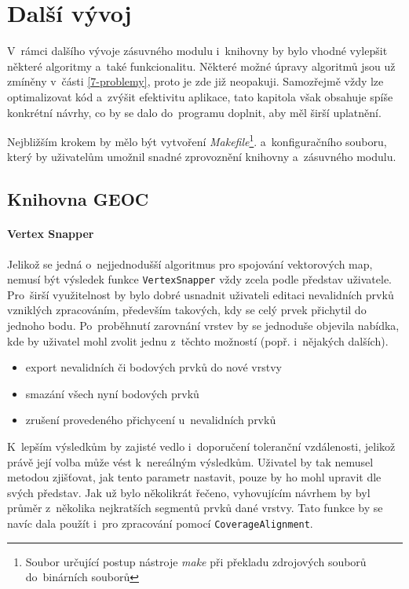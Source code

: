 \chapter{Další vývoj}
\label{8-vyvoj}

V~rámci dalšího vývoje zásuvného modulu i~knihovny 
by bylo vhodné vylepšit některé algoritmy a~také funkcionalitu.
Některé možné úpravy algoritmů jsou už zmíněny v~části 
\ref{7-problemy}, proto je zde již neopakuji. 
Samozřejmě vždy lze optimalizovat kód a~zvýšit efektivitu aplikace,
tato kapitola však obsahuje spíše konkrétní návrhy, co by se dalo 
do~programu doplnit, aby měl širší uplatnění.

Nejbližším krokem by mělo být vytvoření \textit{Makefile}\footnote{
Soubor určující postup nástroje \textit{make} při překladu zdrojových
souborů do~binárních souborů}. a~konfiguračního souboru, který by 
uživatelům umožnil snadné zprovoznění knihovny a~zásuvného modulu.

\section{Knihovna GEOC}
\label{geoc-vyvoj}

\subsubsection{Vertex Snapper}
\label{vs-vyvoj}

Jelikož se jedná o~nejjednodušší algoritmus pro spojování vektorových map,
nemusí být výsledek funkce \texttt{Vertex\-Snapper} vždy zcela podle
představ uživatele. Pro~širší využitelnost by bylo dobré usnadnit
uživateli editaci nevalidních prvků vzniklých zpracováním, především
takových, kdy se celý prvek přichytil do jednoho bodu. Po~proběhnutí
zarovnání vrstev by se jednoduše objevila nabídka, kde by uživatel mohl
zvolit jednu z~těchto možností (popř. i~nějakých dalších). 

\begin{itemize}
 \item export nevalidních či bodových prvků do nové vrstvy 
 \item smazání všech nyní bodových prvků
 \item zrušení provedeného přichycení u~nevalidních prvků
\end{itemize}

K~lepším výsledkům by zajisté vedlo i~doporučení toleranční vzdálenosti,
jelikož právě její volba může vést k~nereálným výsledkům. Uživatel by
tak nemusel metodou  zjišťovat, jak tento parametr 
nastavit, pouze by ho mohl upravit dle svých představ. Jak už bylo
několikrát řečeno, vyhovujícím návrhem by byl průměr z~několika
nejkratších segmentů prvků dané vrstvy. Tato funkce by se navíc dala
použít i~pro zpracování pomocí \texttt{Coverage\-Alignment}.


